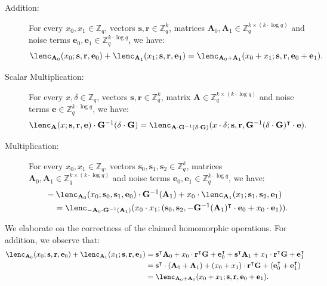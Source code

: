 \documentclass{article}
\newcommand{\Z}{\mathbb{Z}}
\newenvironment{protocol}[1][]
{\begin{algorithm}\caption{#1}}
  {\end{algorithm}}
\begin{document}
\begin{protocol}[Homomorphic Operations on Lattice Encodings]\label{prot:Homomorphic}
\begin{description}
\item[Addition:] For every $x_0, x_1\in\Z_q$, vectors $\mathbf{s}, \mathbf{r}\in \Z_q^k$, matrices $\mathbf{A}_0, \mathbf{A}_1\in\Z_q^{k\times (k\cdot \log q)}$ and noise terms $\mathbf{e}_0, \mathbf{e}_1\in\Z_q^{k\cdot \log q}$, we have:
\[
\lenc_{\mathbf{A}_0} (x_0 ;\mathbf{s}, \mathbf{r}, \mathbf{e}_0) +
\lenc_{\mathbf{A}_1} (x_1;\mathbf{s}, \mathbf{r}, \mathbf{e}_1)
=
\lenc_{\mathbf{A}_0+ \mathbf{A}_1} (x_0+x_1; \mathbf{s}, \mathbf{r}, \mathbf{e}_0 +\mathbf{e}_1).
\]

\item[Scalar Multiplication:] For every $x, \delta\in\Z_q$, vectors $\mathbf{s}, \mathbf{r}\in \Z_q^k$, matrix $\mathbf{A}\in\Z_q^{k\times (k\cdot \log q)}$ and noise terms $\mathbf{e}\in\Z_q^{k\cdot \log q}$, we have:
\[
\lenc_\mathbf{A} (x; \mathbf{s}, \mathbf{r}, \mathbf{e}) \cdot \mathbf{G}^{-1}(\delta\cdot \mathbf{G})
=
\lenc_{\mathbf{A}\cdot \mathbf{G}^{-1}(\delta\cdot \mathbf{G})} (x\cdot \delta; \mathbf{s}, \mathbf{r}, \mathbf{G}^{-1}(\delta\cdot \mathbf{G})^\intercal\cdot\mathbf{e}).
\]

\item[Multiplication:] For every $x_0, x_1\in\Z_q$, vectors $\mathbf{s}_0, \mathbf{s}_1, \mathbf{s}_2\in \Z_q^k$, matrices $\mathbf{A}_0, \mathbf{A}_1\in\Z_q^{k\times (k\cdot \log q)}$ and noise terms $\mathbf{e}_0, \mathbf{e}_1\in\Z_q^{k\cdot \log q}$, we have:
\begin{align*}
&-\lenc_{\mathbf{A}_0}(x_0; \mathbf{s}_0, \mathbf{s}_1, \mathbf{e}_0) \cdot \mathbf{G}^{-1}(\mathbf{A}_1)+x_0\cdot \lenc_{\mathbf{A}_1}(x_1; \mathbf{s}_1, \mathbf{s}_2, \mathbf{e}_1)
\\
&\quad = \lenc_{-\mathbf{A}_0\cdot \mathbf{G}^{-1}(\mathbf{A}_1)}(x_0\cdot x_1; (\mathbf{s}_0, \mathbf{s}_2, -\mathbf{G}^{-1}(\mathbf{A}_1)^\intercal\cdot \mathbf{e}_0+x_0\cdot\mathbf{e}_1)).
\end{align*}
\end{description}
\end{protocol}
We elaborate on the correctness of the claimed homomorphic operations. For addition, we observe that:
\begin{align*}
    \lenc_{\mathbf{A}_0} (x_0 ;\mathbf{s}, \mathbf{r}, \mathbf{e}_0) +
\lenc_{\mathbf{A}_1} (x_1;\mathbf{s}, \mathbf{r}, \mathbf{e}_1)
&=\mathbf{s}^\intercal\mathbf{A}_0+x_0\cdot\mathbf{r}^\intercal \mathbf{G}+\mathbf{e}_0^\intercal+\mathbf{s}^\intercal\mathbf{A}_1+x_1\cdot\mathbf{r}^\intercal \mathbf{G}+\mathbf{e}_1^\intercal\\
&=\mathbf{s}^\intercal\cdot(\mathbf{A}_0+\mathbf{A}_1)+(x_0+x_1)\cdot\mathbf{r}^\intercal \mathbf{G}+(\mathbf{e}_0^\intercal+\mathbf{e}_1^\intercal)\\
    &=\lenc_{\mathbf{A}_0+ \mathbf{A}_1} (x_0+x_1; \mathbf{s}, \mathbf{r}, \mathbf{e}_0 +\mathbf{e}_1).
\end{align*}
\end{document}
